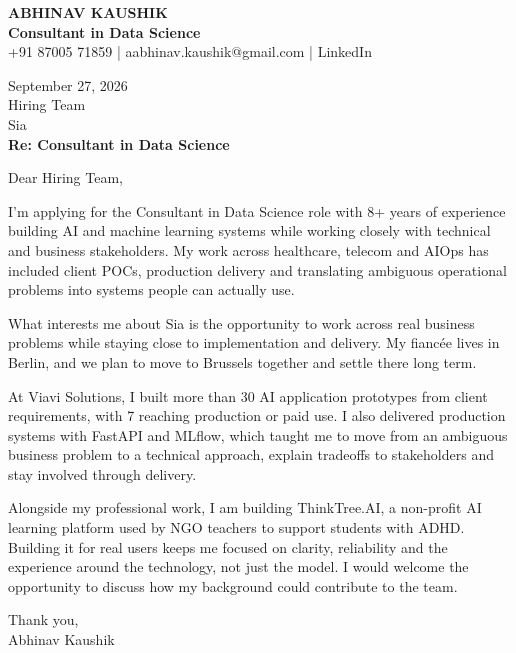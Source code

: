 \documentclass[10pt,a4paper]{article}
\begin{document}
\begin{center}
{\Large\bfseries ABHINAV KAUSHIK}\\[2pt]
{\bfseries Consultant in Data Science}\\[2pt]
+91 87005 71859 \quad | \quad aabhinav.kaushik@gmail.com \quad | \quad LinkedIn
\end{center}
\vspace{8pt}
September 27, 2026\\[6pt]
Hiring Team\\
Sia\\[4pt]
\textbf{Re: Consultant in Data Science}

Dear Hiring Team,

I’m applying for the Consultant in Data Science role with 8+ years of experience building AI and machine learning systems while working closely with technical and business stakeholders. My work across healthcare, telecom and AIOps has included client POCs, production delivery and translating ambiguous operational problems into systems people can actually use.

What interests me about Sia is the opportunity to work across real business problems while staying close to implementation and delivery. My fiancée lives in Berlin, and we plan to move to Brussels together and settle there long term.

At Viavi Solutions, I built more than 30 AI application prototypes from client requirements, with 7 reaching production or paid use. I also delivered production systems with FastAPI and MLflow, which taught me to move from an ambiguous business problem to a technical approach, explain tradeoffs to stakeholders and stay involved through delivery.

Alongside my professional work, I am building ThinkTree.AI, a non-profit AI learning platform used by NGO teachers to support students with ADHD. Building it for real users keeps me focused on clarity, reliability and the experience around the technology, not just the model. I would welcome the opportunity to discuss how my background could contribute to the team.

Thank you,\\
Abhinav Kaushik
\end{document}
